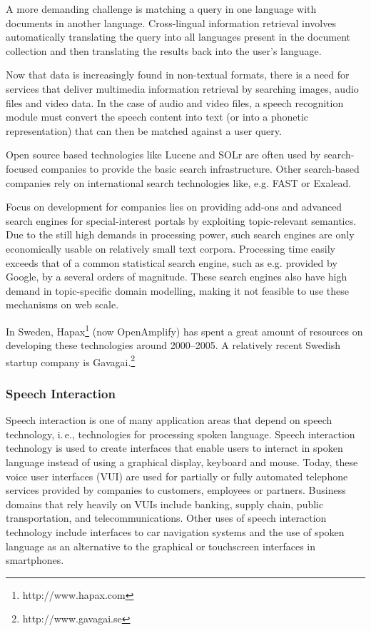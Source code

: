 \begin{multicols}{2}
A more demanding challenge is matching a query in one language with documents in another language. Cross-lingual information retrieval involves automatically translating the query into all languages present in the document collection and then translating the results back into the user's language.

Now that data is increasingly found in non-textual formats, there is a need for services that deliver multimedia information retrieval by searching images, audio files and video data. In the case of audio and video files, a speech recognition module must convert the speech content into text (or into a phonetic representation) that can then be matched against a user query.

Open source based technologies like Lucene and SOLr are often used by search-focused companies to provide the basic search infrastructure. Other search-based companies rely on international search technologies like, e.g. FAST or Exalead.

Focus on development for companies lies on providing add-ons and advanced search engines for special-interest portals by exploiting topic-relevant semantics. Due to the still high demands in processing power, such search engines are only economically usable on relatively small text corpora. Processing time easily exceeds that of a common statistical search engine, such as e.g. provided by Google, by a several orders of magnitude. These search engines also have high demand in topic-specific domain modelling, making it not feasible to use these mechanisms on web scale. 

In Sweden, Hapax\footnote{http://www.hapax.com} (now OpenAmplify) has spent a great amount of resources on developing these technologies around 2000–2005. A relatively recent Swedish startup company is Gavagai.\footnote{http://www.gavagai.se}

\subsubsection{Speech Interaction}

Speech interaction is one of many application areas that depend on speech technology, i.\,e., technologies for processing spoken language. Speech interaction technology is used to create interfaces that enable users to interact in spoken language instead of using a graphical display, keyboard and mouse.  Today, these voice user interfaces (VUI) are used for partially or fully automated telephone services provided by companies to customers, employees or partners. Business domains that rely heavily on VUIs include banking, supply chain, public transportation, and telecommunications. Other uses of speech interaction technology include interfaces to car navigation systems and the use of spoken language as an alternative to the graphical or touchscreen interfaces in smartphones.


\end{multicols}
